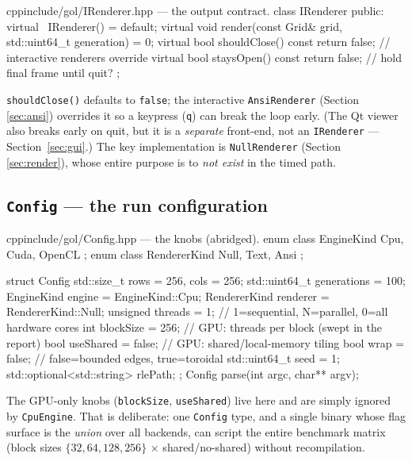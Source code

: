 \documentclass[
	english,
	letterpaper, oneside
]{article}
\begin{document}
\begin{sourcecode}{cpp}{include/gol/IRenderer.hpp --- the output contract.}
class IRenderer {
public:
  virtual ~IRenderer() = default;
  virtual void render(const Grid& grid, std::uint64_t generation) = 0;
  virtual bool shouldClose() const { return false; } // interactive renderers override
  virtual bool staysOpen()  const { return false; }  // hold final frame until quit?
};
\end{sourcecode}

\texttt{shouldClose()} defaults to \texttt{false}; the interactive
\texttt{AnsiRenderer} (Section \ref{sec:ansi}) overrides it so a keypress
(\texttt{q}) can break the loop early. (The Qt viewer also breaks early on quit,
but it is a \emph{separate} front-end, not an \texttt{IRenderer} ---
Section~\ref{sec:gui}.) The key implementation is \texttt{NullRenderer}
(Section \ref{sec:render}), whose entire purpose is to \emph{not exist} in the
timed path.

\subsection{\texttt{Config} --- the run configuration}
\label{sec:config}

\begin{sourcecode}{cpp}{include/gol/Config.hpp --- the knobs (abridged).}
enum class EngineKind { Cpu, Cuda, OpenCL };
enum class RendererKind { Null, Text, Ansi };

struct Config {
  std::size_t rows = 256, cols = 256;
  std::uint64_t generations = 100;
  EngineKind engine = EngineKind::Cpu;
  RendererKind renderer = RendererKind::Null;
  unsigned threads = 1;        // 1=sequential, N=parallel, 0=all hardware cores
  int blockSize = 256;         // GPU: threads per block (swept in the report)
  bool useShared = false;      // GPU: shared/local-memory tiling
  bool wrap = false;           // false=bounded edges, true=toroidal
  std::uint64_t seed = 1;
  std::optional<std::string> rlePath;
};
Config parse(int argc, char** argv);
\end{sourcecode}

The GPU-only knobs (\texttt{blockSize}, \texttt{useShared}) live here and are
simply ignored by \texttt{CpuEngine}. That is deliberate: one \texttt{Config}
type, and a single binary whose flag surface is the \emph{union} over all
backends, can script the entire benchmark matrix (block sizes
$\{32,64,128,256\}$ $\times$ shared/no-shared) without recompilation.
\end{document}
